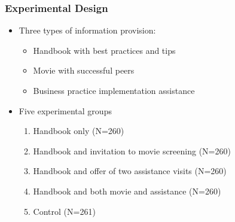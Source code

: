 \documentclass[hideothersubsections, usenames,dvipsnames,10pt]{beamer}
\begin{document}
\begin{frame}
\frametitle{Experimental Design}
	\begin{itemize}
	\item Three types of information provision:
	\vspace{0.05in}
		\begin{itemize}
		\item \textcolor[rgb]{0.00,0.07,1.00}{Handbook} with best practices and tips
		\vspace{0.05in}
		\item \textcolor[rgb]{0.00,0.07,1.00}{Movie} with successful peers
		\vspace{0.05in}
		\item Business practice implementation \textcolor[rgb]{0.00,0.07,1.00}{assistance}
		\end{itemize}
	\vspace{0.05in}
\end{itemize}
	\begin{itemize}
\item{Five experimental groups}
	\vspace{0.05in}
            \begin{enumerate}
              \item \textcolor[rgb]{0.00,0.07,1.00}{Handbook} only (N=260)
              \item \textcolor[rgb]{0.00,0.07,1.00}{Handbook} and invitation to \textcolor[rgb]{0.00,0.07,1.00}{movie} screening (N=260)
              \item \textcolor[rgb]{0.00,0.07,1.00}{Handbook} and offer of two \textcolor[rgb]{0.00,0.07,1.00}{assistance} visits (N=260)
              \item \textcolor[rgb]{0.00,0.07,1.00}{Handbook} and both \textcolor[rgb]{0.00,0.07,1.00}{movie} and \textcolor[rgb]{0.00,0.07,1.00}{assistance} (N=260)
              \item Control (N=261)
            \end{enumerate}
        \end{itemize}
\end{frame}
\end{document}

